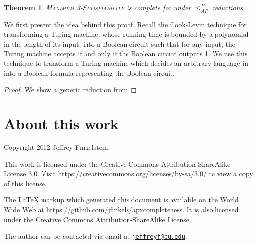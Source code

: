 \documentclass[]{article}
\theoremstyle{plain}
\newtheorem{theorem}{Theorem}
\newcommand{\APr}{\leq_{AP}^{P}}
\newcommand{\email}[1]{\href{mailto:#1}{\nolinkurl{#1}}}
\begin{document}
\begin{theorem}
  \textsc{Maximum 3-Satisfiability} is complete for \APX{} under $\APr$ reductions.
\end{theorem}

We first present the idea behind this proof.
Recall the Cook-Levin technique for transforming a Turing machine, whose running time is bounded by a polynomial in the length of its input, into a Boolean circuit such that for any input, the Turing machine accepts if and only if the Boolean circuit outputs 1.
We use this technique to transform a Turing machine which decides an arbitrary language in \APX{} into a Boolean formula representing the Boolean circuit.

\begin{proof}
  We show a generic reduction from 
\end{proof}

\section*{About this work}

Copyright 2012 Jef{}frey Finkelstein.

This work is licensed under the Creative Commons Attribution-ShareAlike License 3.0.
Visit \mbox{\url{https://creativecommons.org/licenses/by-sa/3.0/}} to view a copy of this license.

The \LaTeX{} markup which generated this document is available on the World Wide Web at \mbox{\url{https://github.com/jfinkels/apxcompleteness}}.
It is also licensed under the Creative Commons Attribution-ShareAlike License.

The author can be contacted via email at \email{jeffreyf@bu.edu}.



\end{document}
